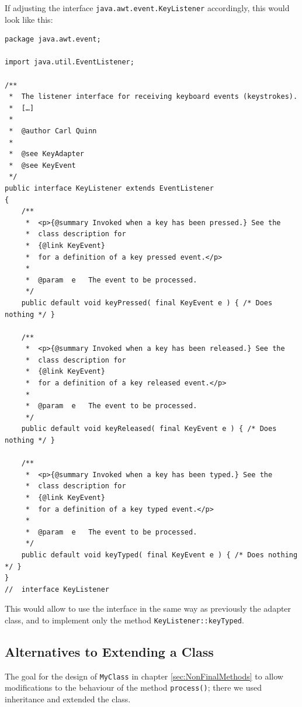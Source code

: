 \documentclass[11pt,a4paper, titlepage, parskip=half, headsepline, footsepline, cleardoublepage=current, headheight=1cm]{scrbook}
\newcommand*{\tqref}[1]{\hyperref[{#1}]{\ref*{#1}}}
\begin{document}
If adjusting the interface \lstinline|java.awt.event.KeyListener| accordingly, this would look like this:
\begin{lstlisting}
package java.awt.event;

import java.util.EventListener;

/**
 *  The listener interface for receiving keyboard events (keystrokes).
 *  […]
 *
 *  @author Carl Quinn
 *
 *  @see KeyAdapter
 *  @see KeyEvent
 */
public interface KeyListener extends EventListener 
{
    /**
     *  <p>{@summary Invoked when a key has been pressed.} See the
     *  class description for 
     *  {@link KeyEvent}
     *  for a definition of a key pressed event.</p>
     *
     *  @param  e   The event to be processed.
     */
    public default void keyPressed( final KeyEvent e ) { /* Does nothing */ }

    /**
     *  <p>{@summary Invoked when a key has been released.} See the
     *  class description for 
     *  {@link KeyEvent} 
     *  for a definition of a key released event.</p>
     *
     *  @param  e   The event to be processed.
     */
    public default void keyReleased( final KeyEvent e ) { /* Does nothing */ }

    /**
     *  <p>{@summary Invoked when a key has been typed.} See the
     *  class description for 
     *  {@link KeyEvent} 
     *  for a definition of a key typed event.</p>
     *
     *  @param	e   The event to be processed.
     */
    public default void keyTyped( final KeyEvent e ) { /* Does nothing */ }
}
//  interface KeyListener
\end{lstlisting}

This would allow to use the interface in the same way as previously the adapter class, and to implement only the method \lstinline|KeyListener::keyTyped|.


\subsection{Alternatives to Extending a Class}
The goal for the design of \lstinline|MyClass| in chapter \tqref{sec:NonFinalMethods} to allow modifications to the behaviour of the method \lstinline|process()|; there we used inheritance and extended the class.
\end{document}

